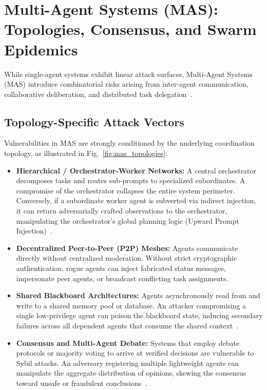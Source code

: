 \section{Multi-Agent Systems (MAS): Topologies, Consensus, and Swarm Epidemics}
\label{sec:multi_agent}

While single-agent systems exhibit linear attack surfaces, Multi-Agent Systems (MAS) introduce combinatorial risks arising from inter-agent communication, collaborative deliberation, and distributed task delegation~\cite{dewitt2025open, raza2026trism}.

\subsection{Topology-Specific Attack Vectors}
\label{subsec:mas_topologies}

Vulnerabilities in MAS are strongly conditioned by the underlying coordination topology, as illustrated in Fig.~\ref{fig:mas_topologies}:



\begin{itemize}
    \item \textbf{Hierarchical / Orchestrator-Worker Networks:} A central orchestrator decomposes tasks and routes sub-prompts to specialized subordinates. A compromise of the orchestrator collapses the entire system perimeter. Conversely, if a subordinate worker agent is subverted via indirect injection, it can return adversarially crafted observations to the orchestrator, manipulating the orchestrator's global planning logic (Upward Prompt Injection)~\cite{narajala2025securing, hammar2026multiagent}.
    \item \textbf{Decentralized Peer-to-Peer (P2P) Meshes:} Agents communicate directly without centralized moderation. Without strict cryptographic authentication, rogue agents can inject fabricated status messages, impersonate peer agents, or broadcast conflicting task assignments.
    \item \textbf{Shared Blackboard Architectures:} Agents asynchronously read from and write to a shared memory pool or database. An attacker compromising a single low-privilege agent can poison the blackboard state, inducing secondary failures across all dependent agents that consume the shared context~\cite{chen2024agentpoison}.
    \item \textbf{Consensus and Multi-Agent Debate:} Systems that employ debate protocols or majority voting to arrive at verified decisions are vulnerable to Sybil attacks. An adversary registering multiple lightweight agents can manipulate the aggregate distribution of opinions, skewing the consensus toward unsafe or fraudulent conclusions~\cite{chen2024blockagents}.
\end{itemize}

